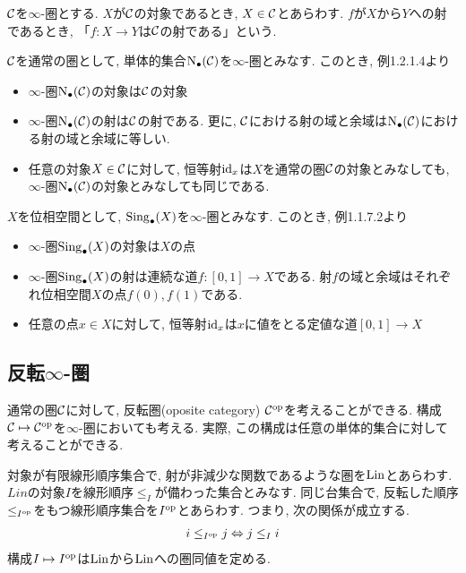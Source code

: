 \documentclass[uplatex, a4paper, 14Q, dvipdfmx]{jsreport}
\begin{document}
\begin{nota}
  $\mathcal{C}$を$\infty$-圏とする. 
  $X$が$\mathcal{C}$の対象であるとき, $X \in \mathcal{C}$とあらわす. 
  $f$が$X$から$Y$への射であるとき, 「$f: X \to Y$は$\mathcal{C}$の射である」という. 
\end{nota}

\begin{example}
  $\mathcal{C}$を通常の圏として, 単体的集合$\mathrm{N}_{\bullet}(\mathcal{C})$を$\infty$-圏とみなす. 
  このとき, 例1.2.1.4より
  \begin{itemize}
    \item $\infty$-圏$\mathrm{N}_{\bullet}(\mathcal{C})$の対象は$\mathcal{C}$の対象
    \item $\infty$-圏$\mathrm{N}_{\bullet}(\mathcal{C})$の射は$\mathcal{C}$の射である. 
    更に, $\mathcal{C}$における射の域と余域は$\mathrm{N}_{\bullet}(\mathcal{C})$における射の域と余域に等しい.
    \item 任意の対象$X \in \mathcal{C}$に対して, 恒等射$\mathrm{id}_x$は$X$を通常の圏$\mathcal{C}$の対象とみなしても, $\infty$-圏$\mathrm{N}_{\bullet}(\mathcal{C})$の対象とみなしても同じである. 
  \end{itemize}
\end{example}

\begin{example}
  $X$を位相空間として, $\mathrm{Sing}_\bullet(X)$を$\infty$-圏とみなす. 
  このとき, 例1.1.7.2より
  \begin{itemize}
    \item $\infty$-圏$\mathrm{Sing}_\bullet(X)$の対象は$X$の点 
    \item $\infty$-圏$\mathrm{Sing}_\bullet(X)$の射は連続な道$f: [0,1] \to X$である. 
    射$f$の域と余域はそれぞれ位相空間$X$の点$f(0), f(1)$である. 
    \item 任意の点$x \in X$に対して, 恒等射$\mathrm{id}_x$は$x$に値をとる定値な道$[0,1] \to X$
  \end{itemize}
\end{example}

\subsection{反転\texorpdfstring{$\infty$}{infty}-圏}

通常の圏$\mathcal{C}$に対して, 反転圏(oposite category) $\mathcal{C}^{\mathrm{op}}$を考えることができる. 
構成$\mathcal{C} \mapsto \mathcal{C}^{\mathrm{op}}$を$\infty$-圏においても考える. 
実際, この構成は任意の単体的集合に対して考えることができる. 

\begin{nota}
  対象が有限線形順序集合で, 射が非減少な関数であるような圏を$\mathrm{Lin}$とあらわす. 
  $Lin$の対象$I$を線形順序$\leq_I$が備わった集合とみなす. 
  同じ台集合で, 反転した順序$\leq_{I^{\mathrm{op}}}$をもつ線形順序集合を$I^{\mathrm{op}}$とあらわす. 
  つまり, 次の関係が成立する. 
  \begin{align*}
    i \leq_{I^{\mathrm{op}}} j \Leftrightarrow j \leq_I i
  \end{align*}
  構成$I \mapsto I^{\mathrm{op}}$は$\mathrm{Lin}$から$\mathrm{Lin}$への圏同値を定める. 
\end{nota}
\end{document}

